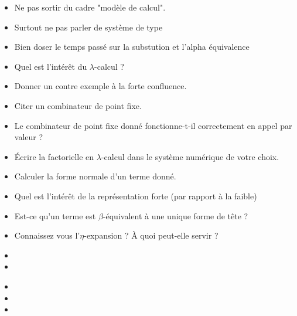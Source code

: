 \documentclass{agregfiche}
\begin{document}
\secpieges

\begin{itemize}
    \item Ne pas sortir du cadre "modèle de calcul".
    \item Surtout ne pas parler de système de type
    \item Bien doser le temps passé sur la substution et l'alpha équivalence
\end{itemize}

\secquestionsclassiques

\begin{itemize}
    \item Quel est l'intérêt du $\lambda$-calcul ?
    \item Donner un contre exemple à la forte confluence.
    \item Citer un combinateur de point fixe.
    \item Le combinateur de point fixe donné 
        fonctionne-t-il correctement en appel 
        par valeur ?
    \item Écrire la factorielle en $\lambda$-calcul 
        dans le système numérique de votre choix.
    \item Calculer la forme normale d'un terme donné.
    \item Quel est l'intérêt de la représentation forte (par rapport à la faible)
    \item Est-ce qu'un terme est $\beta$-équivalent à une unique forme de tête ?
    \item Connaissez vous l'$\eta$-expansion ? À quoi peut-elle servir ?
\end{itemize}

\secreferences

\begin{itemize}
    \item {}
    \item {}
\end{itemize}


\secdev

\begin{itemize}
    \item {}
    \item {}
    \item {}
\end{itemize}
\end{document}
